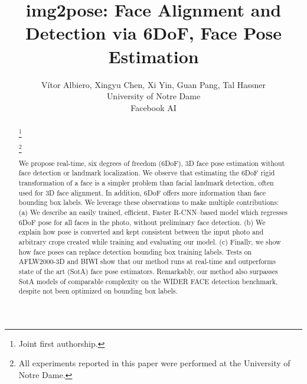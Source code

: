 \documentclass[final]{cvpr}
\newcommand\blfootnote[1]{\begingroup
  \renewcommand\thefootnote{}\footnote{#1}\addtocounter{footnote}{-1}\endgroup
}
\begin{document}
\title{img2pose: Face Alignment and Detection via 6DoF, Face Pose Estimation\vspace{-3mm}}

\author{Vítor Albiero, 
Xingyu Chen, Xi Yin, Guan Pang, Tal Hassner\\
University of Notre Dame\\
Facebook AI\\
}



\begin{abstract}
\blfootnote{ Joint first authorship.}
\blfootnote{All experiments reported in this paper were performed at the University of Notre Dame.}We propose real-time, six degrees of freedom (6DoF), 3D face pose estimation without face detection or landmark localization. We observe that estimating the 6DoF rigid transformation of a face is a simpler problem than facial landmark detection, often used for 3D face alignment. In addition, 6DoF offers more information than face bounding box labels. We leverage these observations to make multiple contributions: (a) We describe an easily trained, efficient, Faster R-CNN--based model which regresses 6DoF pose for all faces in the photo, without preliminary face detection. (b) We explain how pose is converted and kept consistent between the input photo and arbitrary crops created while training and evaluating our model. (c) Finally, we show how face poses can replace detection bounding box training labels. Tests on AFLW2000-3D and BIWI show that our method runs at real-time and outperforms state of the art (SotA) face pose estimators. Remarkably, our method also surpasses SotA models of comparable complexity on the WIDER FACE detection benchmark, despite not been optimized on bounding box labels.\vspace{-5mm}
\end{abstract}
\end{document}
